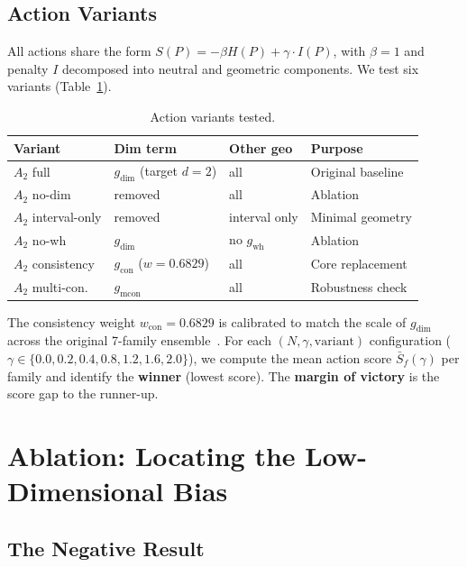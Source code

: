 \documentclass[11pt,a4paper]{article}
\begin{document}
\subsection{Action Variants}

All actions share the form $S(P) = -\beta H(P) + \gamma \cdot I(P)$, with $\beta = 1$ and penalty $I$ decomposed into neutral and geometric components. We test six variants (Table~\ref{tab:variants}).

\begin{table}[H]
\centering
\caption{Action variants tested.}
\label{tab:variants}
\begin{tabular}{llll}
\toprule
\textbf{Variant} & \textbf{Dim term} & \textbf{Other geo} & \textbf{Purpose} \\
\midrule
$A_2$ full & $g_{\text{dim}}$ (target $d{=}2$) & all & Original baseline \\
$A_2$ no-dim & removed & all & Ablation \\
$A_2$ interval-only & removed & interval only & Minimal geometry \\
$A_2$ no-wh & $g_{\text{dim}}$ & no $g_{\text{wh}}$ & Ablation \\
$A_2$ consistency & $g_{\text{con}}$ ($w{=}0.6829$) & all & Core replacement \\
$A_2$ multi-con. & $g_{\text{mcon}}$ & all & Robustness check \\
\bottomrule
\end{tabular}
\end{table}

The consistency weight $w_{\text{con}} = 0.6829$ is calibrated to match the scale of $g_{\text{dim}}$ across the original 7-family ensemble~\cite{zhang2026companion}. For each $(N, \gamma, \text{variant})$ configuration ($\gamma \in \{0.0, 0.2, 0.4, 0.8, 1.2, 1.6, 2.0\}$), we compute the mean action score $\bar{S}_f(\gamma)$ per family and identify the \textbf{winner} (lowest score). The \textbf{margin of victory} is the score gap to the runner-up.

\section{Ablation: Locating the Low-Dimensional Bias}\label{sec:ablation}

\subsection{The Negative Result}
\end{document}
